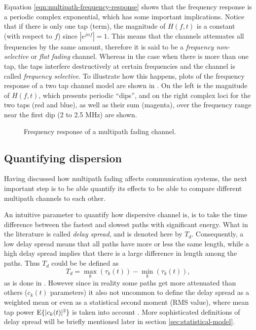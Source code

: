 Equation \eqref{eqn:multipath-frequency-response} shows that the frequency response is a periodic complex exponential, which has some important implications. Notice that if there is only one tap (term), the magnitude of \(H(f, t)\) is a constant (with respect to \(f\)) since \(|e^{j\alpha f}| = 1\). This means that the channels attenuates all frequencies by the same amount, therefore it is said to be a \emph{frequency non-selective} or \emph{flat fading} channel. Whereas in the case when there is more than one tap, the taps interfere destructively at certain frequencies and the channel is called \emph{frequency selective}. To illustrate how this happens, plots of the frequency response of a two tap channel model are shown in . On the left is the magnitude of \(H(f, t)\), which presents periodic ``dips'', and on the right complex loci for the two taps (red and blue), as well as their sum (magenta), over the frequency range near the first dip (2 to 2.5 MHz) are shown.

\begin{figure}
	\centering
	\resizebox{\linewidth}{!}{
		
	}
	\caption{
		Frequency response of a multipath fading channel.
		\label{fig:multipath-frequency-response-plots}
	}
\end{figure}

\subsection{Quantifying dispersion}

Having discussed how multipath fading affects communication systems, the next important step is to be able quantify its effects to be able to compare different multipath channels to each other.

An intuitive parameter to quantify how dispersive channel is, is to take the time difference between the fastest and slowest paths with significant energy. What in the literature is called \emph{delay spread}, and is denoted here by \(T_d\). Consequently, a low delay spread means that all paths have more or less the same length, while a high delay spread implies that there is a large difference in length among the paths. Thus \(T_d\) could be be defined as
\begin{equation}
	T_d = \max_{k} (\tau_k(t)) -  \min_{k} (\tau_k(t)),
\end{equation}
as is done in \cite{Gallager}. However since in reality some paths get more attenuated than others (\(c_k(t)\) parameters) it also not uncommon to define the delay spread as a weighted mean or even as a statistical second moment (RMS value), where mean tap power \(\operatorname{E}\{|c_k(t)|^2\}\) is taken into account \cite{Mathis,Messier}. More sophisticated definitions of delay spread will be briefly mentioned later in section \ref{sec:statistical-model}.

